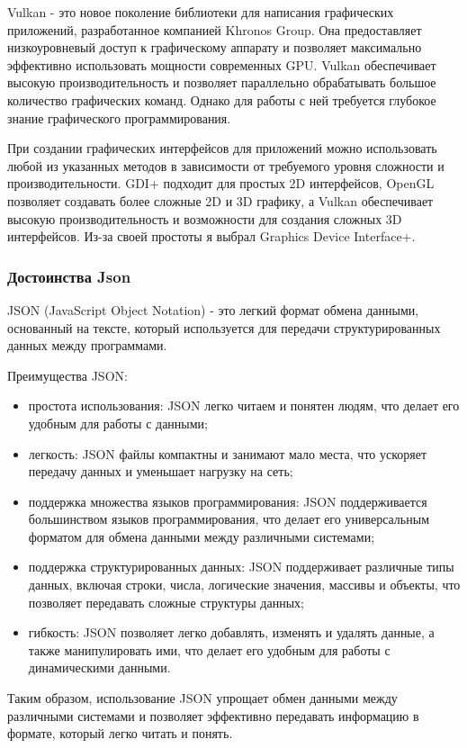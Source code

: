 Vulkan\cite{vulkan} - это новое поколение библиотеки для написания графических приложений, разработанное компанией Khronos Group. Она предоставляет низкоуровневый доступ к графическому аппарату и позволяет максимально эффективно использовать мощности современных GPU. Vulkan обеспечивает высокую производительность и позволяет параллельно обрабатывать большое количество графических команд. Однако для работы с ней требуется глубокое знание графического программирования.

При создании графических интерфейсов для приложений можно использовать любой из указанных методов в зависимости от требуемого уровня сложности и производительности. GDI+ подходит для простых 2D интерфейсов, OpenGL позволяет создавать более сложные 2D и 3D графику, а Vulkan обеспечивает высокую производительность и возможности для создания сложных 3D интерфейсов. Из-за своей простоты я выбрал Graphics Device Interface+.

\subsubsection{Достоинства Json}

JSON (JavaScript Object Notation) - это легкий формат обмена данными, основанный на тексте, который используется для передачи структурированных данных между программами.

Преимущества JSON:
\begin{itemize}
\item простота использования: JSON легко читаем и понятен людям, что делает его удобным для работы с данными;
\item легкость: JSON файлы компактны и занимают мало места, что ускоряет передачу данных и уменьшает нагрузку на сеть;
\item поддержка множества языков программирования: JSON поддерживается большинством языков программирования, что делает его универсальным форматом для обмена данными между различными системами;
\item поддержка структурированных данных: JSON поддерживает различные типы данных, включая строки, числа, логические значения, массивы и объекты, что позволяет передавать сложные структуры данных;
\item гибкость: JSON позволяет легко добавлять, изменять и удалять данные, а также манипулировать ими, что делает его удобным для работы с динамическими данными.
\end{itemize}
Таким образом, использование JSON упрощает обмен данными между различными системами и позволяет эффективно передавать информацию в формате, который легко читать и понять.

